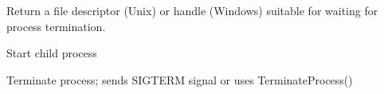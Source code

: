 \documentclass[letterpaper,10pt,english]{sphinxmanual}
\begin{document}
\begin{fulllineitems}

\begin{fulllineitems}
\label{\detokenize{mongoDB_data_ingestion:ingest_raw.Timer.run}}
\end{fulllineitems}


\begin{fulllineitems}
\label{\detokenize{mongoDB_data_ingestion:ingest_raw.Timer.sentinel}}
Return a file descriptor (Unix) or handle (Windows) suitable for
waiting for process termination.

\end{fulllineitems}


\begin{fulllineitems}
\label{\detokenize{mongoDB_data_ingestion:ingest_raw.Timer.start}}
Start child process

\end{fulllineitems}


\begin{fulllineitems}
\label{\detokenize{mongoDB_data_ingestion:ingest_raw.Timer.terminate}}
Terminate process; sends SIGTERM signal or uses TerminateProcess()

\end{fulllineitems}


\end{fulllineitems}

\end{document}
